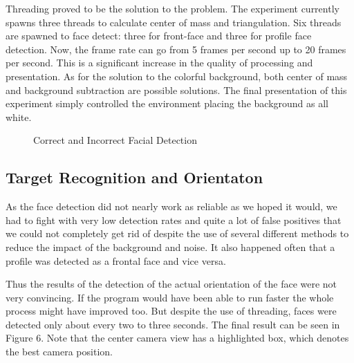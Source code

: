 \documentclass{acm_proc_article-sp}
\begin{document}
Threading proved to be the solution to the problem.  The experiment currently spawns three threads to calculate center of mass and triangulation.  Six threads are 
spawned to face detect: three for front-face and three for profile face detection.  Now, the frame rate can go from 5 frames per second up to 20 frames per second.  
This is a significant increase in the quality of processing and presentation.  As for the solution to the colorful background, both center of mass and background
subtraction are possible solutions.  The final presentation of this experiment simply controlled the environment placing the background as all white.

	\begin{figure}
		\centering
		\hfill
		\hfill
		\caption{\label{fig:profileface}Correct and Incorrect Facial Detection}
	\end{figure}

\subsection{Target Recognition and Orientaton}
As the face detection did not nearly work as reliable as we hoped it would, we had to fight with very low detection rates and quite a lot of false positives that we could not completely get rid of despite the use of several different methods to reduce the impact of the background and noise. It also happened often that a profile was detected as a frontal face and vice versa.

Thus the results of the detection of the actual orientation of the face were not very convincing. If the program would have been able to run faster the whole process might have improved too. But despite the use of threading, faces were detected only about every two to three seconds.  The final result can be seen in Figure 6.  Note that the center camera view has a highlighted box, which denotes the best camera position.
\end{document}
